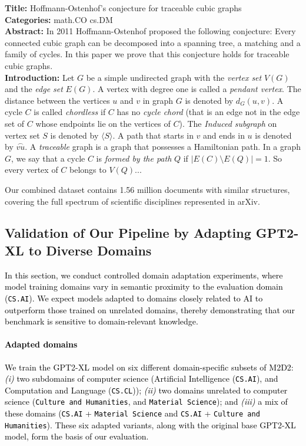 \documentclass[10pt]{article}
\newcommand{\revision}[1]{\textcolor{black}{#1}}
\begin{document}
\begin{tcolorbox}[title=Sample Document: arXiv ID 1607.04768]
\textbf{Title:} Hoffmann-Ostenhof's conjecture for traceable cubic graphs\\
\textbf{Categories:} math.CO cs.DM\\
\textbf{Abstract:} In 2011 Hoffmann-Ostenhof proposed the following conjecture: 
Every connected cubic graph can be decomposed into a spanning tree, a matching and a family of cycles. 
In this paper we prove that this conjecture holds for traceable cubic graphs.\\

\small{
\textbf{Introduction:} 
Let $G$ be a simple undirected graph with the \textit{vertex set} $V(G)$ and the \textit{edge set} $E(G)$. 
A vertex with degree one is called a \textit{pendant vertex}. The distance between the vertices $u$ and $v$ in graph $G$ is denoted by $d_G(u,v)$. 
A cycle $C$ is called \textit{chordless} if $C$ has no \textit{cycle chord} (that is an edge not in the edge set of $C$ whose endpoints lie on the vertices of $C$). 
The \textit{Induced subgraph} on vertex set $S$ is denoted by $\langle S\rangle$. 
A path that starts in $v$ and ends in $u$ is denoted by $\stackrel\frown{v u}$. 
A \textit{traceable} graph is a graph that possesses a Hamiltonian path. 
In a graph $G$, we say that a cycle $C$ is \textit{formed by the path} $Q$ if $ | E(C) \setminus E(Q) | = 1 $. So every vertex of $C$ belongs to $V(Q)$...
}
\end{tcolorbox}

Our combined dataset contains 1.56 million documents with similar structures, covering the full spectrum of scientific disciplines represented in arXiv.


\subsection{Validation of Our Pipeline by Adapting GPT2-XL to Diverse Domains}
\label{subsec:supplementary_gpt2_adaptive}

\revision{In this section, we conduct controlled domain adaptation experiments, where model training domains vary in semantic proximity to the evaluation domain (\texttt{CS.AI}). We expect models adapted to domains closely related to AI to outperform those trained on unrelated domains, thereby demonstrating that our benchmark is sensitive to domain-relevant knowledge.}

\paragraph{\revision{Adapted domains}} 
\revision{We train the GPT2-XL model on six different domain-specific subsets of M2D2: 
\textit{(i)} two subdomains of computer science (Artificial Intelligence (\texttt{CS.AI}), and Computation and Language (\texttt{CS.CL})); \textit{(ii)} two domains unrelated to computer science (\texttt{Culture and Humanities}, and \texttt{Material Science}); and \textit{(iii)} a mix of these domains (\texttt{CS.AI} + \texttt{Material Science} and \texttt{CS.AI} + \texttt{Culture and Humanities}).
These six adapted variants, along with the original base GPT2-XL model, form the basis of our evaluation.}
\end{document}
